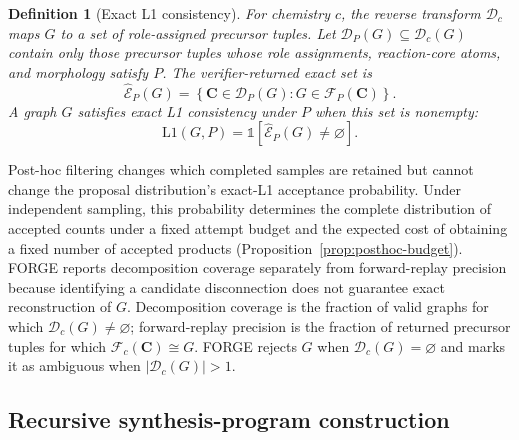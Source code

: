 \documentclass{article}
\newtheorem{definition}[theorem]{Definition}
\begin{document}
\begin{definition}[Exact L1 consistency]
For chemistry $c$, the reverse transform $\mathcal{D}_c$ maps $G$ to a set of role-assigned precursor
tuples.
Let $\mathcal{D}_P(G)\subseteq\mathcal{D}_c(G)$ contain only those precursor tuples whose role
assignments, reaction-core atoms, and morphology satisfy $P$.
The verifier-returned exact set is
\begin{equation}
    \widehat{\mathcal E}_P(G)
    =
    \left\{
        \mathbf C\in\mathcal D_P(G):
        G\in\mathcal F_P(\mathbf C)
    \right\}.
\end{equation}
A graph $G$ satisfies exact L1 consistency under $P$ when this set is nonempty:
\begin{equation}
    \mathrm{L1}(G,P)
    = \mathbb{1}\!\left[
        \widehat{\mathcal E}_P(G)\neq\varnothing
    \right].
\end{equation}
\end{definition}
Post-hoc filtering changes which completed samples are retained but cannot change the proposal
distribution's exact-L1 acceptance probability.
Under independent sampling, this probability determines the complete distribution of accepted
counts under a fixed attempt budget and the expected cost of obtaining a fixed number of accepted
products (Proposition~\ref{prop:posthoc-budget}).
FORGE reports decomposition coverage separately from forward-replay precision because identifying a
candidate disconnection does not guarantee exact reconstruction of $G$.
Decomposition coverage is the fraction of valid graphs for which
$\mathcal{D}_c(G)\neq\varnothing$; forward-replay precision is the fraction of returned precursor
tuples for which $\mathcal{F}_c(\mathbf{C})\cong G$.
FORGE rejects $G$ when $\mathcal{D}_c(G)=\varnothing$ and marks it as ambiguous when
$\lvert\mathcal{D}_c(G)\rvert>1$.

\subsection{Recursive synthesis-program construction}
\end{document}
